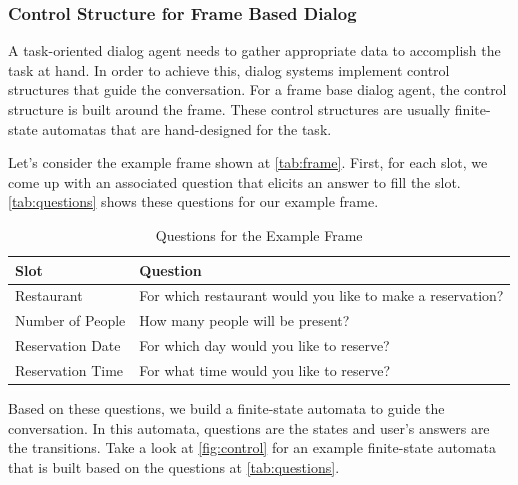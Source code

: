 \subsubsection{Control Structure for Frame Based Dialog}
A task-oriented dialog agent needs to gather appropriate data to accomplish the task at hand.
In order to achieve this, dialog systems implement control structures that guide the conversation.
For a frame base dialog agent, the control structure is built around the frame.
These control structures are usually finite-state automatas that are hand-designed for the task. 

Let's consider the example frame shown at \autoref{tab:frame}.
First, for each slot, we come up with an associated question that elicits an answer to fill the slot.
\autoref{tab:questions} shows these questions for our example frame.

\begin{table}[htbp]
  \caption[Questions for the Example Frame]{Questions for the Example Frame}\label{tab:questions}
  \centering
  \begin{tabular}{l|l}
    Slot&Question\\ \toprule
    Restaurant&For which restaurant would you like to make a reservation?\\ \hline
    Number of People&How many people will be present?\\ \hline
    Reservation Date&For which day would you like to reserve?\\ \hline
    Reservation Time&For what time would you like to reserve?\\ \hline
  \end{tabular}
\end{table}

Based on these questions, we build a finite-state automata to guide the conversation.
In this automata, questions are the states and user's answers are the transitions.
Take a look at \autoref{fig:control} for an example finite-state automata that is built based on the questions at \autoref{tab:questions}.

